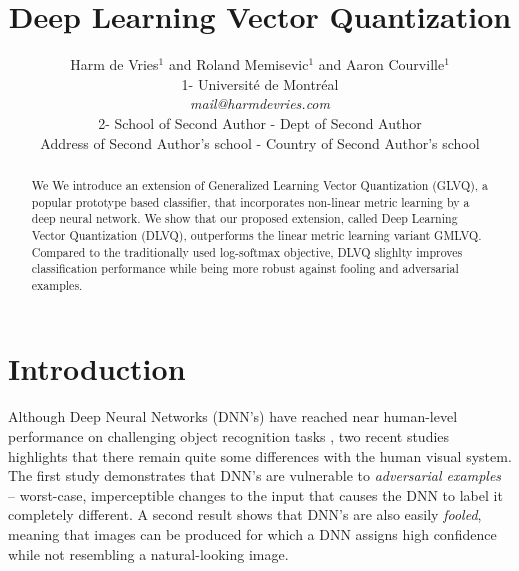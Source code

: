 \documentclass{esannV2}
\begin{document}
\title{Deep Learning Vector Quantization}

\author{Harm de Vries$^1$ and Roland Memisevic$^1$ and Aaron Courville$^1$
%
%
\vspace{.3cm}\\
%
1- Universit\'{e} de Montr\'{e}al \\
\textit{mail@harmdevries.com}
%
\vspace{.1cm}\\
2- School of Second Author - Dept of Second Author \\
Address of Second Author's school - Country of Second Author's school\\
}

\maketitle

\begin{abstract}
We 
We introduce an extension of Generalized Learning Vector Quantization (GLVQ), a popular prototype based classifier, that incorporates non-linear metric learning by a deep neural network. We show that our proposed extension, called Deep Learning Vector Quantization (DLVQ), outperforms the linear metric learning variant GMLVQ. Compared to the traditionally used log-softmax objective, DLVQ slighlty improves classification performance while being more robust against fooling and adversarial examples. 
\end{abstract}

\section{Introduction}
Although Deep Neural Networks (DNN's) \cite{DBLP:journals/corr/abs-1206-5538} have reached near human-level performance on challenging object recognition tasks \cite{krizhevsky2012imagenet,DBLP:journals/corr/IoffeS15}, two recent studies \cite{DBLP:journals/corr/SzegedyZSBEGF13,DBLP:journals/corr/NguyenYC14} highlights that there remain quite some differences with the human visual system. The first study \cite{DBLP:journals/corr/SzegedyZSBEGF13} demonstrates that DNN's are vulnerable to \emph{adversarial examples} -- worst-case, imperceptible changes to the input that causes the DNN to label it completely different. A second result \cite{DBLP:journals/corr/NguyenYC14} shows that DNN's are also easily \emph{fooled}, meaning that images can be produced for which a DNN assigns high confidence while not resembling a natural-looking image.
\end{document}
